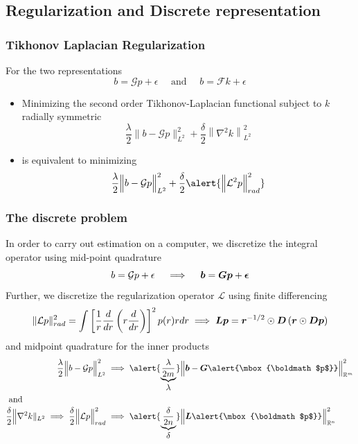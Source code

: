 \documentclass[]{beamer}
\newcommand{\R}{\ensuremath{\mathbb R}}  %
\newcommand{\ds}{\displaystyle}
\newcommand{\G}{\ensuremath{\mathcal G}}
\newcommand{\LL}{\ensuremath{\mathcal L}}
\newcommand{\bm}[1]{\mbox{\boldmath$#1$}}
\newcommand{\vect}[1]{\bm{#1}}
\begin{document}
\subsection{Regularization and Discrete representation}
\begin{frame}
  \frametitle{Tikhonov Laplacian Regularization}
  {\footnotesize For the two representations }
  \begin{equation*}
    b = \mathcal G p + \epsilon\quad\text{ and }\quad b= \mathcal F k + \epsilon
  \end{equation*}
  {\footnotesize
  \begin{itemize}
    \itemsep 1.2em
    \item Minimizing the second order Tikhonov-Laplacian functional subject to $k$ radially symmetric
    $$ \frac \lambda 2 \Big\|b - \G p\Big\|_{L^2}^2 + \frac \delta 2 \left\|\nabla^2 k\right\|_{L^2}^2  $$
    \item is equivalent to minimizing 
    $$ \frac \lambda 2 \Big\|b - \G p\Big\|_{L^2}^2 + \frac \delta 2 \alert{\Big\|\LL^2 p\Big\|_{rad}^2}  $$
  \end{itemize}
  }
\end{frame}
\begin{frame}
  \frametitle{The discrete problem}
  {\footnotesize 
  In order to carry out estimation on a computer, we discretize the integral operator using \alert{mid-point quadrature}}
  $$
    b = \mathcal G p + \epsilon\quad \implies \quad \vect b = \vect G \vect p + \vect\epsilon
  $$
  {\footnotesize  Further, we discretize the regularization operator $\LL$ using \alert{finite differencing} }
    $$ 
      \ds{\|\LL p\|_{rad}^2 = \int \left[\frac1r \frac{d}{dr} \left(r \frac d{dr} \right)\right]^2 p(r) rdr}
      \implies 
      \vect L \vect p = \vect r^{-1/2} \odot \vect D \left(\vect r \odot \vect D\vect p\right) 
    $$
    {\footnotesize and \alert{midpoint quadrature} for the inner products
    \begin{align*}
      \frac \lambda {2} \Big\|b - \G p\Big\|_{L^2}^2 &\implies \alert{\underbrace{\frac \lambda {2m}}_{\ds{\lambda}}} \Big\|\vect b - \vect G \alert{\vect p}\Big\|_{\R^m}^2 \\ 
      \intertext{ and }
      \frac\delta2 \Big\|\nabla^2 k\|_{L^2} \implies \frac \delta {2} \Big\|\LL p\Big\|_{rad}^2  &\implies \alert{\underbrace{\frac \delta {2n}}_{\ds{\delta}}} \Big\|\vect L  \alert{\vect p}\Big\|_{\R^n}^2  
    \end{align*}
    }
\end{frame}
\end{document}
